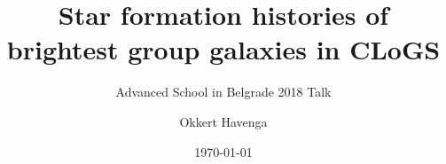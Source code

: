\documentclass{beamer}
\title{Star formation histories of brightest group galaxies in CLoGS}
\subtitle{Advanced School in Belgrade 2018 Talk}
\author{Okkert Havenga}
\institute{North-West University Centre for Space Research}
\date{\today}
\begin{document}
\begin{frame}
\titlepage
\end{frame}
\end{document}
